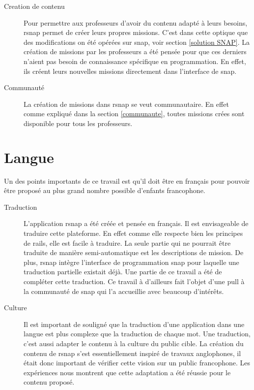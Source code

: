 \begin{description}
  \item[Creation de contenu] Pour permettre aux professeurs d'avoir du contenu adapté à leurs besoins, \gls{rsnap} permet de créer leurs propres \glspl{mission}. C'est dans cette optique que des modifications on été opérées sur \gls{snap}, voir section \ref{solution SNAP}. La création de \glspl{mission} par les professeurs a été pensée pour que ces derniers n'aient pas besoin de connaissance spécifique en programmation. En effet, ils créent leurs nouvelles \glspl{mission} directement dans l'interface de \gls{snap}.

  \item[Communauté] La création de \glspl{mission} dans \gls{rsnap} se veut communautaire. En effet comme expliqué dans la section \ref{communaute}, toutes \glspl{mission} crées sont disponible pour tous les professeurs.
\end{description}

\section{Langue}

Un des points importants de ce travail est qu'il doit être en français pour pouvoir être proposé au plus grand nombre possible d'enfants francophone.

\begin{description}
  \item[Traduction] L'application \gls{rsnap} a été créée et pensée en français. Il est envisageable de traduire cette plateforme. En effet comme elle respecte bien les principes de \gls{rails}, elle est facile à traduire. La seule partie qui ne pourrait être traduite de manière semi-automatique est les descriptions de \gls{mission}. De plus, \gls{rsnap} intègre l'interface de programmation \gls{snap} pour laquelle une traduction partielle existait déjà. Une partie de ce travail a été de compléter cette traduction. Ce travail à d'ailleurs fait l'objet d'une \gls{pull} à la communauté de \gls{snap} qui l'a accueillie avec beaucoup d'intérêts.

  \item[Culture] Il est important de souligné que la traduction d'une application dans une langue est plus complexe que la traduction de chaque mot. Une traduction, c'est aussi adapter le contenu à la culture du public cible. La création du contenu de \gls{rsnap} s'est essentiellement inspiré de travaux anglophones, il était donc important de vérifier cette vision sur un public francophone. Les expériences nous montrent que cette adaptation a été réussie pour le contenu proposé.

\end{description}

